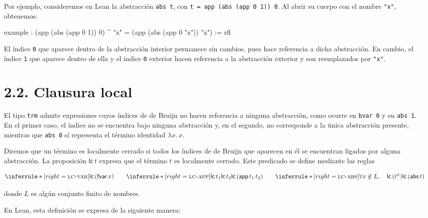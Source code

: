 \documentclass[
  spanish,
  letterpaper,
  DIV=11,
  numbers=noendperiod]{scrreprt}
\newenvironment{Shaded}{\begin{snugshade}}{\end{snugshade}}
\newcommand{\KeywordTok}[1]{\textcolor[rgb]{0.00,0.23,0.31}{\textbf{#1}}}
\newcommand{\NormalTok}[1]{\textcolor[rgb]{0.00,0.23,0.31}{#1}}
\newcommand{\StringTok}[1]{\textcolor[rgb]{0.13,0.47,0.30}{#1}}
\renewcommand{\NormalTok}[1]{\textcolor[HTML]{000000}{#1}}
\renewcommand{\KeywordTok}[1]{\textcolor[HTML]{0000FF}{#1}}
\renewcommand{\StringTok}[1]{\textcolor[HTML]{A52A2A}{#1}}
\theoremstyle{remark}
\begin{document}
Por ejemplo, consideremos en Lean la abstracción \texttt{abs\ t}, con
\texttt{t\ =\ app\ (abs\ (app\ 0\ 1))\ 0}. Al abrir su cuerpo con el
nombre \texttt{"x"}, obtenemos:

\begin{Shaded}
\begin{Highlighting}[]
\KeywordTok{example}\NormalTok{ :}
\NormalTok{  (app (abs (app 0 1)) 0) \^{} }\StringTok{"x"}\NormalTok{ = (app (abs (app 0 }\StringTok{"x"}\NormalTok{)) }\StringTok{"x"}\NormalTok{) := }\KeywordTok{rfl}
\end{Highlighting}
\end{Shaded}

El índice \texttt{0} que aparece dentro de la abstracción interior
permanece sin cambios, pues hace referencia a dicha abstracción. En
cambio, el índice \texttt{1} que aparece dentro de ella y el índice
\texttt{0} exterior hacen referencia a la abstracción exterior y son
reemplazados por \texttt{"x"}.

\section{2.2. Clausura local}\label{clausura-local}

El tipo \texttt{trm} admite expresiones cuyos índices de de Bruijn no
hacen referencia a ninguna abstracción, como ocurre en \texttt{bvar\ 0}
y en \texttt{abs\ 1}. En el primer caso, el índice no se encuentra bajo
ninguna abstracción y, en el segundo, no corresponde a la única
abstracción presente, mientras que \texttt{abs\ 0} sí representa el
término identidad \(\lambda x.\,x\).

Diremos que un término es localmente cerrado si todos los índices de de
Bruijn que aparecen en él se encuentran ligados por alguna abstracción.
La proposición \(\mathsf{lc} \, t\) expresa que el término \(t\) es
localmente cerrado. Este predicado se define mediante las reglas

\[
\inferrule*[right=\textsc{lc-var}]
  { }
  {\mathsf{lc} \, (\mathsf{fvar}\,x)}
\qquad
\inferrule*[right=\textsc{lc-app}]
  {\mathsf{lc} \, t_1 \\ \mathsf{lc} \, t_2}
  {\mathsf{lc} \, (\mathsf{app} \, t_1 \, t_2)}
\qquad
\inferrule*[right=\textsc{lc-abs}]
  {\forall x \notin L, \quad \mathsf{lc} \, (t^x)}
  {\mathsf{lc} \, (\mathsf{abs}\,t)}
\]

donde \(L\) es algún conjunto finito de nombres.

En Lean, esta definición se expresa de la siguiente manera:
\end{document}
